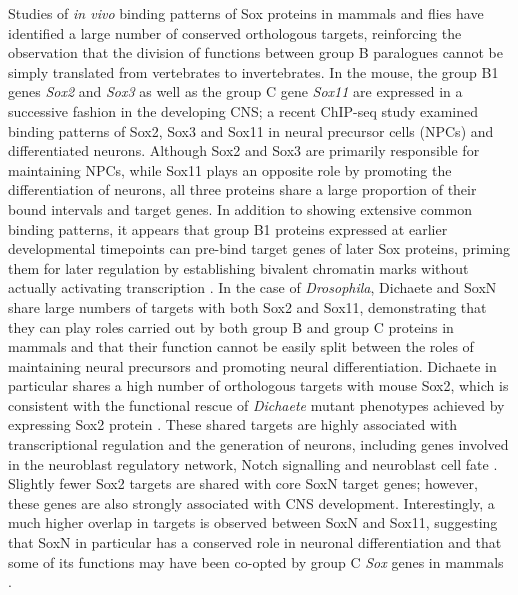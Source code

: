 Studies of \emph{in vivo} binding patterns of Sox proteins in mammals and flies have identified a large number of conserved orthologous targets, reinforcing the observation that the division of functions between group B paralogues cannot be simply translated from vertebrates to invertebrates. In the mouse, the group B1 genes \emph{Sox2} and \emph{Sox3} as well as the group C gene \emph{Sox11} are expressed in a successive fashion in the developing CNS; a recent ChIP-seq study examined binding patterns of Sox2, Sox3 and Sox11 in neural precursor cells (NPCs) and differentiated neurons. Although Sox2 and Sox3 are primarily responsible for maintaining NPCs, while Sox11 plays an opposite role by promoting the differentiation of neurons, all three proteins share a large proportion of their bound intervals and target genes. In addition to showing extensive common binding patterns, it appears that group B1 proteins expressed at earlier developmental timepoints can pre-bind target genes of later Sox proteins, priming them for later regulation by establishing bivalent chromatin marks without actually activating transcription \citep{bergsland_sequentially_2011}. In the case of \emph{Drosophila}, Dichaete and SoxN share large numbers of targets with both Sox2 and Sox11, demonstrating that they can play roles carried out by both group B and group C proteins in mammals and that their function cannot be easily split between the roles of maintaining neural precursors and promoting neural differentiation. Dichaete in particular shares a high number of orthologous targets with mouse Sox2, which is consistent with the functional rescue of \emph{Dichaete} mutant phenotypes achieved by expressing Sox2 protein \citep{soriano_drosophila_1998}. These shared targets are highly associated with transcriptional regulation and the generation of neurons, including genes involved in the neuroblast regulatory network, Notch signalling and neuroblast cell fate \citep{aleksic_role_2013}. Slightly fewer Sox2 targets are shared with core SoxN target genes; however, these genes are also strongly associated with CNS development. Interestingly, a much higher overlap in targets is observed between SoxN and Sox11, suggesting that SoxN in particular has a conserved role in neuronal differentiation and that some of its functions may have been co-opted by group C \emph{Sox} genes in mammals \citep{ferrero_soxneuro_2014}.\\

